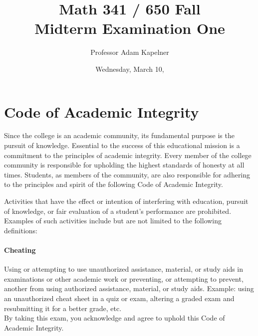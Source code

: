 \documentclass[12pt,landscape]{article}
\title{Math 341 / 650 Fall \the\year{} \\ Midterm Examination One}
\author{Professor Adam Kapelner}
\date{Wednesday, March 10, \the\year{}}
\begin{document}
\maketitle


\thispagestyle{empty}

\section*{Code of Academic Integrity}

\footnotesize
Since the college is an academic community, its fundamental purpose is the pursuit of knowledge. Essential to the success of this educational mission is a commitment to the principles of academic integrity. Every member of the college community is responsible for upholding the highest standards of honesty at all times. Students, as members of the community, are also responsible for adhering to the principles and spirit of the following Code of Academic Integrity.

Activities that have the effect or intention of interfering with education, pursuit of knowledge, or fair evaluation of a student's performance are prohibited. Examples of such activities include but are not limited to the following definitions:

\paragraph{Cheating} Using or attempting to use unauthorized assistance, material, or study aids in examinations or other academic work or preventing, or attempting to prevent, another from using authorized assistance, material, or study aids. Example: using an unauthorized cheat sheet in a quiz or exam, altering a graded exam and resubmitting it for a better grade, etc.
\\

\noindent By taking this exam, you acknowledge and agree to uphold this Code of Academic Integrity. \\


\normalsize
\end{document}
